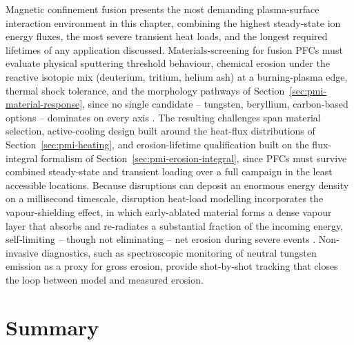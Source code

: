 Magnetic confinement fusion presents the most demanding plasma-surface interaction environment in this chapter, combining the highest steady-state ion energy fluxes, the most severe transient heat loads, and the longest required lifetimes of any application discussed. Materials-screening for fusion PFCs must evaluate physical sputtering threshold behaviour, chemical erosion under the reactive isotopic mix (deuterium, tritium, helium ash) at a burning-plasma edge, thermal shock tolerance, and the morphology pathways of Section~\ref{sec:pmi-material-response}, since no single candidate -- tungsten, beryllium, carbon-based options -- dominates on every axis \cite{ref0189}. The resulting challenges span material selection, active-cooling design built around the heat-flux distributions of Section~\ref{sec:pmi-heating}, and erosion-lifetime qualification built on the flux-integral formalism of Section~\ref{sec:pmi-erosion-integral}, since PFCs must survive combined steady-state and transient loading over a full campaign in the least accessible locations. Because disruptions can deposit an enormous energy density on a millisecond timescale, disruption heat-load modelling incorporates the vapour-shielding effect, in which early-ablated material forms a dense vapour layer that absorbs and re-radiates a substantial fraction of the incoming energy, self-limiting -- though not eliminating -- net erosion during severe events \cite{ref0176}. Non-invasive diagnostics, such as spectroscopic monitoring of neutral tungsten emission as a proxy for gross erosion, provide shot-by-shot tracking that closes the loop between model and measured erosion.

\section*{Summary}

